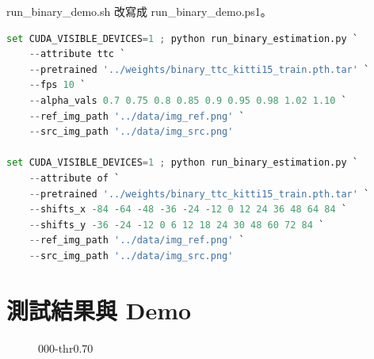\documentclass[10pt,UTF8]{ctexart}
\begin{document}
run\_binary\_demo.sh 改寫成 run\_binary\_demo.ps1。

\begin{lstlisting}[language={python}]
set CUDA_VISIBLE_DEVICES=1 ; python run_binary_estimation.py `
    --attribute ttc `
    --pretrained '../weights/binary_ttc_kitti15_train.pth.tar' `
    --fps 10 `
    --alpha_vals 0.7 0.75 0.8 0.85 0.9 0.95 0.98 1.02 1.10 `
    --ref_img_path '../data/img_ref.png' `
    --src_img_path '../data/img_src.png' 

set CUDA_VISIBLE_DEVICES=1 ; python run_binary_estimation.py `
    --attribute of `
    --pretrained '../weights/binary_ttc_kitti15_train.pth.tar' `
    --shifts_x -84 -64 -48 -36 -24 -12 0 12 24 36 48 64 84 `
    --shifts_y -36 -24 -12 0 6 12 18 24 30 48 60 72 84 `
    --ref_img_path '../data/img_ref.png' `
    --src_img_path '../data/img_src.png' 

\end{lstlisting}

\section{測試結果與 Demo}


\begin{figure}[H]
\centering  %
\caption{000-thr0.70}
\label{Fig.main}
\end{figure}
\end{document}
